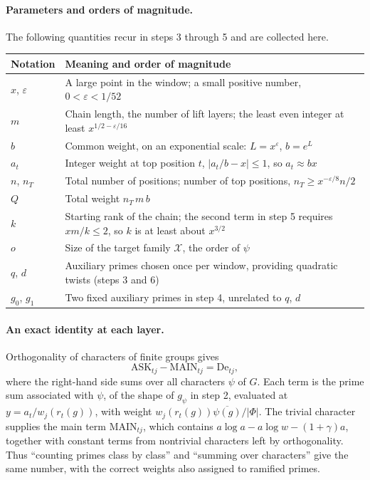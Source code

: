 \documentclass[11pt]{article}
\begin{document}
\paragraph{Parameters and orders of magnitude.} The following quantities recur in steps 3 through 5 and are collected here.
\begin{center}\small
\begin{tabular}{@{}ll@{}}
\toprule
Notation & Meaning and order of magnitude\\
\midrule
$x$, $\varepsilon$ & A large point in the window; a small positive number, $0<\varepsilon<1/52$\\
$m$ & Chain length, the number of lift layers; the least even integer at least $x^{1/2-\varepsilon/16}$\\
$b$ & Common weight, on an exponential scale: $L=x^\varepsilon$, $b=e^{L}$\\
$a_t$ & Integer weight at top position $t$, $|a_t/b-x|\le1$, so $a_t\approx bx$\\
$n$, $n_T$ & Total number of positions; number of top positions, $n_T\ge x^{-\varepsilon/8}n/2$\\
$Q$ & Total weight $n_T\,m\,b$\\
$k$ & Starting rank of the chain; the second term in step 5 requires $xm/k\le2$, so $k$ is at least about $x^{3/2}$\\
$o$ & Size of the target family $\mathcal X$, the order of $\psi$\\
$q$, $d$ & Auxiliary primes chosen once per window, providing quadratic twists (steps 3 and 6)\\
$g_0$, $g_1$ & Two fixed auxiliary primes in step 4, unrelated to $q$, $d$\\
\bottomrule
\end{tabular}
\end{center}

\paragraph{An exact identity at each layer.} Orthogonality of characters of finite groups gives
\[
\mathrm{ASK}_{tj}-\mathrm{MAIN}_{tj}=\mathrm{De}_{tj},
\]
where the right-hand side sums over all characters $\psi$ of $G$. Each term is the prime sum associated with $\psi$, of the shape of $g_\psi$ in step 2, evaluated at $y=a_t/w_j(r_t(g))$, with weight $w_j(r_t(g))\overline{\psi(g)}/|\Phi|$. The trivial character supplies the main term $\mathrm{MAIN}_{tj}$, which contains $a\log a-a\log w-(1+\gamma)a$, together with constant terms from nontrivial characters left by orthogonality. Thus ``counting primes class by class'' and ``summing over characters'' give the same number, with the correct weights also assigned to ramified primes.
\end{document}
